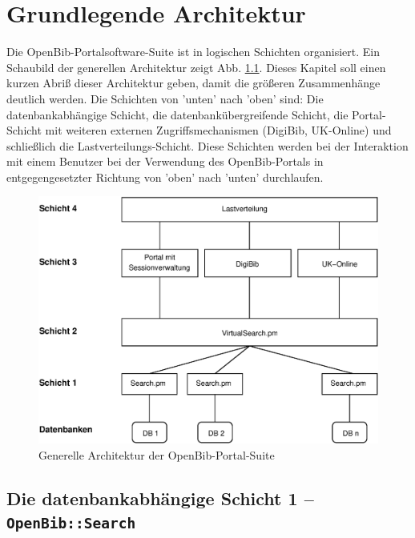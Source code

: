 \documentclass[11pt, twoside, a4paper, BCOR8mm, DIV12, bibtotoc,idxtotoc]{scrbook}
\begin{document}
\chapter{Grundlegende Architektur}

Die OpenBib-Portalsoftware-Suite ist in logischen Schichten
organisiert. Ein Schaubild der ge\-ne\-rellen Architektur zeigt Abb.
\ref{bild:architektur}. Dieses Kapitel soll einen kurzen Abriß dieser
Architektur geben, damit die größeren Zusammenhänge deutlich
werden. Die Schichten von 'unten' nach 'oben' sind: Die
datenbankabhängige Schicht, die datenbankübergreifende Schicht, die
Portal-Schicht mit weiteren externen Zugriffsmechanismen (DigiBib,
UK-Online) und schließlich die Lastverteilungs-Schicht. Diese
Schichten werden bei der Interaktion mit einem Benutzer bei der
Verwendung des OpenBib-Portals in entgegengesetzter Richtung von
'oben' nach 'unten' durchlaufen.


\begin{figure}
\begin{shadowenv}
  \vspace{4mm}
    \centering \begin{minipage}[b]{1.0\textwidth}
      \centering \includegraphics[width=12cm]{schicht04.eps}
    \end{minipage}
    \caption{Generelle Architektur der OpenBib-Portal-Suite}
  \label{bild:architektur}
  \vspace{3mm}
\end{shadowenv}
\end{figure}

\section{Die datenbankabhängige Schicht 1 -- \texttt{OpenBib::Search}}
\end{document}
